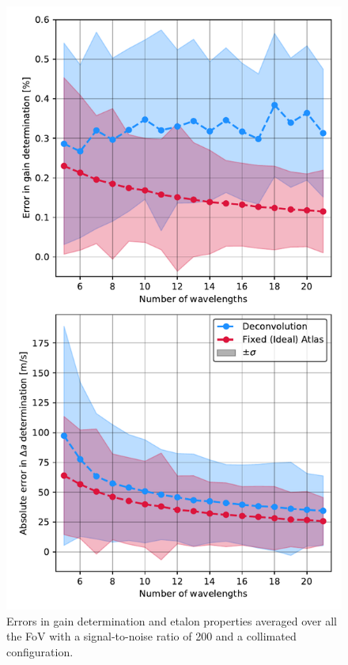 \begin{figure}
    \centering
     \includegraphics[width=\textwidth]{figures/EtalonPaper/Deconvolution_results.pdf}
    \caption[Errors for the deconvolution approach.]{Errors in gain determination and etalon properties averaged over all the FoV with a signal-to-noise ratio of 200 and a collimated configuration.}
    \label{fig_etalon_corr:Deconvolution-results}
\end{figure}

